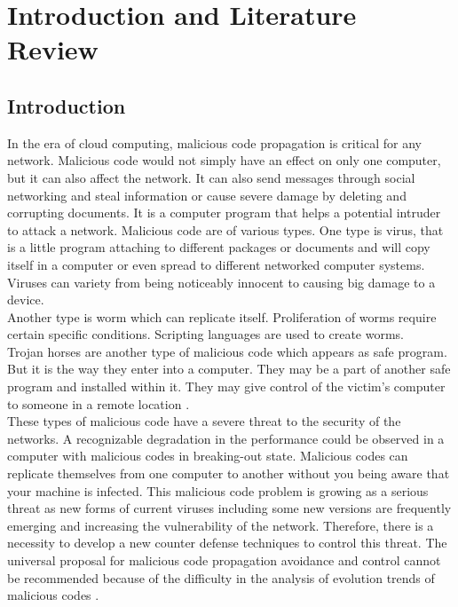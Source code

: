 
\setcounter{page}{1}
\chapter{Introduction and Literature Review}

\section{Introduction}
In the era of cloud computing, malicious code propagation is critical for any network. Malicious code would not simply have an effect on only one computer, but it can also affect the network. It can also send messages through social networking and steal information or cause severe damage by deleting and corrupting documents. It is a computer program that helps a potential intruder to attack a network.
Malicious code are of various types. One type is virus, that is a little program attaching to different packages or documents and will copy itself in a computer or even spread to different networked computer systems. Viruses can variety from being noticeably innocent to causing big damage to a device.\\
Another type is worm which can replicate itself. Proliferation of worms require certain specific conditions. Scripting languages are used to create worms.\\
Trojan horses are another type of malicious code which appears as safe program. But it is the way they enter into a computer. They may be a part of another safe program and installed within it. They may give control of the victim's computer to someone in a remote location \cite{goswami2012information}.\\
These types of malicious code  have a severe threat to the security of the networks. A recognizable degradation in the performance could be observed in a computer with malicious codes in breaking-out state. Malicious codes can replicate themselves from one computer to another without you being aware that your machine is infected. This malicious code problem is growing as a serious threat as new forms of current viruses including some new versions are frequently emerging and increasing the vulnerability of the network. Therefore, there is a necessity to develop a new counter defense techniques to control this threat. The universal proposal for malicious code propagation avoidance and control cannot be recommended because of the difficulty in the analysis of evolution trends of malicious codes \cite{yang2012towards}.\\
